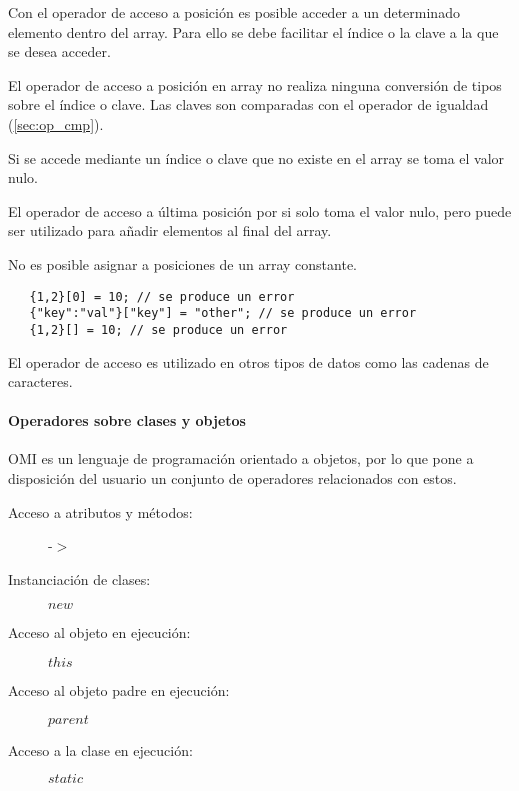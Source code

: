 Con el operador de acceso a posición es posible acceder a un determinado elemento
dentro del array. Para ello se debe facilitar el índice o la clave a la que 
se desea acceder. 

El operador de acceso a posición en array no realiza ninguna conversión de tipos sobre 
el índice o clave. Las claves son comparadas con el operador de igualdad (\autoref{sec:op_cmp}).

Si se accede mediante un índice o clave que no existe en el array se toma el valor nulo.

El operador de acceso a última posición por si solo toma el valor nulo, pero puede ser utilizado 
para añadir elementos al final del array. 

No es posible asignar a posiciones de un array constante. \\

\begin{lstlisting}
   {1,2}[0] = 10; // se produce un error
   {"key":"val"}["key"] = "other"; // se produce un error
   {1,2}[] = 10; // se produce un error
\end{lstlisting} 

El operador de acceso es utilizado en otros tipos de datos como las cadenas
de caracteres.


\paragraph{Operadores sobre clases y objetos} \label{sec:op_object}

OMI es un lenguaje de programación orientado a objetos, por lo que pone a 
disposición del usuario un conjunto de operadores relacionados con estos. \\

\begin{description}
\item [Acceso a atributos y métodos:] -$>$
\item [Instanciación de clases:] $new$
\item [Acceso al objeto en ejecución:] $this$ 
\item [Acceso al objeto padre en ejecución:] $parent$ 
\item [Acceso a la clase en ejecución:] $static$ 
\end{description} 

